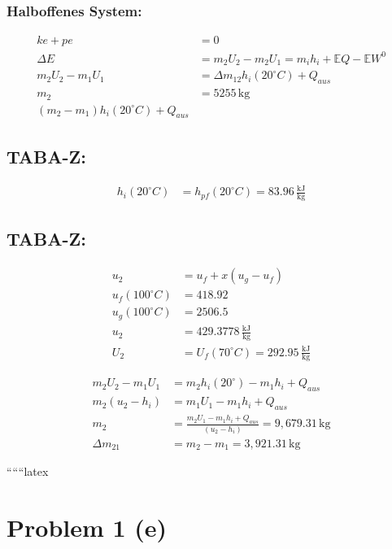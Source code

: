 \subsubsection*{Halboffenes System:}
\begin{align*}
ke + pe &= 0 \\
\Delta E &= m_2 U_2 - m_2 U_1 = m_i h_i + \mathbb{E} Q - \mathbb{E} W^0 \\
m_2 U_2 - m_1 U_1 &= \Delta m_{12} h_i (20^\circ C) + Q_{aus} \\
m_2 &= 5255 \, \text{kg} \\
(m_2 - m_1) h_i (20^\circ C) + Q_{aus}
\end{align*}

\subsection*{TABA-Z:}
\begin{align*}
h_i (20^\circ C) &= h_{pf} (20^\circ C) = 83.96 \, \frac{\text{kJ}}{\text{kg}}
\end{align*}

\subsection*{TABA-Z:}
\begin{align*}
u_2 &= u_f + x (u_g - u_f) \\
u_f (100^\circ C) &= 418.92 \\
u_g (100^\circ C) &= 2506.5 \\
u_2 &= 429.3778 \, \frac{\text{kJ}}{\text{kg}} \\
U_2 &= U_f (70^\circ C) = 292.95 \, \frac{\text{kJ}}{\text{kg}}
\end{align*}

\begin{align*}
m_2 U_2 - m_1 U_1 &= m_2 h_i (20^\circ) - m_1 h_i + Q_{aus} \\
m_2 (u_2 - h_i) &= m_1 U_1 - m_1 h_i + Q_{aus} \\
m_2 &= \frac{m_2 U_1 - m_1 h_i + Q_{aus}}{(u_2 - h_i)} = 9,679.31 \, \text{kg} \\
\Delta m_{21} &= m_2 - m_1 = 3,921.31 \, \text{kg}
\end{align*}

``````latex


\section*{Problem 1 (e)}

